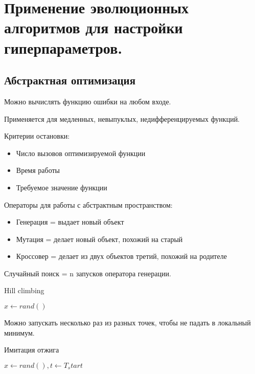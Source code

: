 \section{Применение эволюционных алгоритмов для настройки гиперпараметров.}

\subsection*{Абстрактная оптимизация}

Можно вычислять функцию ошибки на любом входе.

Применяется для медленных, невыпуклых, недифференцируемых
функций.

Критерии остановки:
\begin{itemize}
    \item Число вызовов оптимизируемой функции
    \item Время работы
    \item Требуемое значение функции
\end{itemize}

Операторы для работы с абстрактным пространством:
\begin{itemize}
    \item Генерация = выдает новый объект
    \item Мутация = делает новый объект, похожий на старый
    \item Кроссовер = делает из двух объектов третий, похожий
    на родителе
\end{itemize}

Случайный поиск = n запусков оператора генерации.

\begin{algorithm}[H]
\caption{Hill climbing}
$x \gets rand()$

\end{algorithm}

Можно запускать несколько раз из разных точек, чтобы не падать
в локальный минимум.

\begin{algorithm}[H]
    \caption{Имитация отжига}
    $x \gets rand(), t \gets T_start$

\end{algorithm}

